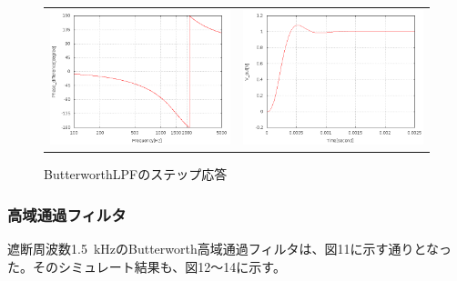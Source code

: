 \documentclass[10pt,a4j,dvipdfmx]{jsarticle}
\begin{document}
  \begin{figure}[H]
      \begin{tabular}{cc}
        \begin{minipage}[t]{0.45\hsize}
          \centering
          \includegraphics[width=8cm]{BLPF_Agraf.png}
          \caption{ButterworthLPFの位相特性}
        \end{minipage} &
        \begin{minipage}[t]{0.45\hsize}
          \centering
          \includegraphics[width = 8cm]{BLPFstep.png}
          \caption{ButterworthLPFのステップ応答}
        \end{minipage}
      \end{tabular}
    \end{figure}
 
 \subsubsection{高域通過フィルタ}
 遮断周波数\SI{1.5}{\kilo\hertz}のButterworth高域通過フィルタは、図11に示す通りとなった。そのシミュレート結果も、図12〜14に示す。
 
\end{document}
